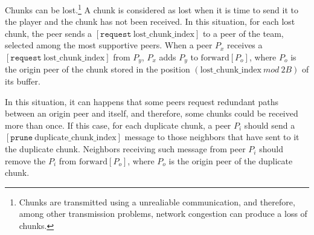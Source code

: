 
\label{sec:routes_discovery}

Chunks can be lost.\footnote{Chunks are transmitted using a
  unrealiable communication, and therefore, among other transmission
  problems, network congestion can produce a loss of chunks.} A chunk
is considered as lost when it is time to send it to the player and the
chunk has not been received.  In this situation, for each lost chunk,
the peer sends a $[\mathtt{request}~\text{lost\_chunk\_index}]$ to a
peer of the team, selected among the most supportive peers. When a
peer $P_x$ receives a $[\mathtt{request}~\text{lost\_chunk\_index}]$
from $P_y$, $P_x$ adds $P_y$ to $\text{forward}[P_o]$, where $P_o$ is
the origin peer of the chunk stored in the position
$(\text{lost\_chunk\_index}~\mathit{mod}~2B)$ of its buffer.

\begin{comment}
origin peer of the next chunk stored in the
buffer. This peer has to characteristics: (1) it is not necessary a
neighbor peer, and (2) there is a high probability that this chunk has
been stored in the buffer ``for a long time'', so, if it is not a
neighbor, the link between it and the peer is working fairly well.
\end{comment}

  
In this situation, it can happens that some peers request
redundant paths between an origin peer and itself, and therefore, some
chunks could be received more than once. If this case, for each
duplicate chunk, a peer $P_i$ should send a $[\mathtt{prune}~\text{duplicate\_chunk\_index}]$ message to those neighbors that
have sent to it the duplicate chunk. Neighbors receiving such message
from peer $P_i$ should remove the $P_i$ from $\text{forward}[P_o]$,
where $P_o$ is the origin peer of the duplicate chunk.

